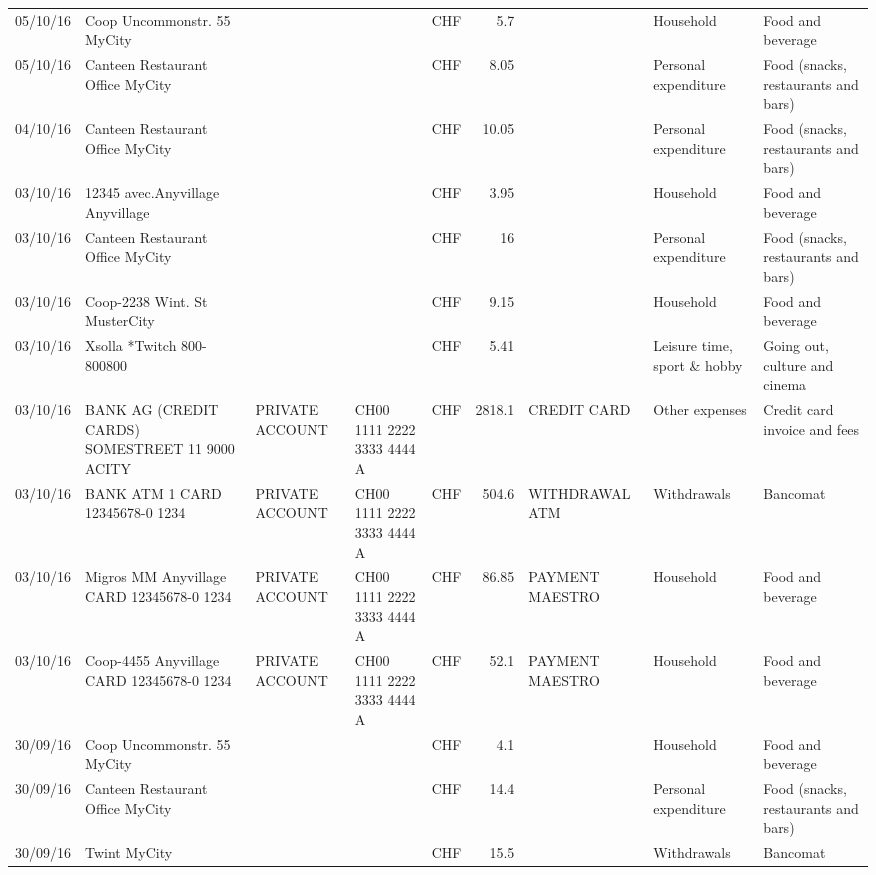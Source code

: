 \begin{landscape}
\begin{table}[h]
\begin{center}
\begin{tabular}{rllllrlll}
		05/10/16 & Coop Uncommonstr. 55   MyCity &       &       & CHF   & 5.7   &       & Household & Food and beverage \\
		05/10/16 & Canteen Restaurant Office      MyCity &       &       & CHF   & 8.05  &       & Personal expenditure & Food (snacks, restaurants and bars) \\
		04/10/16 & Canteen Restaurant Office      MyCity &       &       & CHF   & 10.05 &       & Personal expenditure & Food (snacks, restaurants and bars) \\
		03/10/16 & 12345 avec.Anyvillage   Anyvillage &       &       & CHF   & 3.95  &       & Household & Food and beverage \\
		03/10/16 & Canteen Restaurant Office      MyCity &       &       & CHF   & 16    &       & Personal expenditure & Food (snacks, restaurants and bars) \\
		03/10/16 & Coop-2238 Wint. St       MusterCity &       &       & CHF   & 9.15  &       & Household & Food and beverage \\
		03/10/16 & Xsolla *Twitch           800-800800 &       &       & CHF   & 5.41  &       & Leisure time, sport \& hobby & Going out, culture and cinema \\
		03/10/16 & BANK AG (CREDIT CARDS) SOMESTREET 11 9000 ACITY & PRIVATE ACCOUNT & CH00 1111 2222 3333 4444 A & CHF   & 2818.1 & CREDIT CARD & Other expenses & Credit card invoice and fees \\
		03/10/16 & BANK ATM 1 CARD 12345678-0 1234 & PRIVATE ACCOUNT & CH00 1111 2222 3333 4444 A & CHF   & 504.6 & WITHDRAWAL ATM & Withdrawals & Bancomat \\
		03/10/16 & Migros MM Anyvillage CARD 12345678-0 1234 & PRIVATE ACCOUNT & CH00 1111 2222 3333 4444 A & CHF   & 86.85 & PAYMENT MAESTRO & Household & Food and beverage \\
		03/10/16 & Coop-4455 Anyvillage CARD 12345678-0 1234 & PRIVATE ACCOUNT & CH00 1111 2222 3333 4444 A & CHF   & 52.1  & PAYMENT MAESTRO & Household & Food and beverage \\
		30/09/16 & Coop Uncommonstr. 55   MyCity &       &       & CHF   & 4.1   &       & Household & Food and beverage \\
		30/09/16 & Canteen Restaurant Office      MyCity &       &       & CHF   & 14.4  &       & Personal expenditure & Food (snacks, restaurants and bars) \\
		30/09/16 & Twint               MyCity &       &       & CHF   & 15.5  &       & Withdrawals & Bancomat \\

\end{tabular}
\end{center}
\end{table}
\end{landscape}
